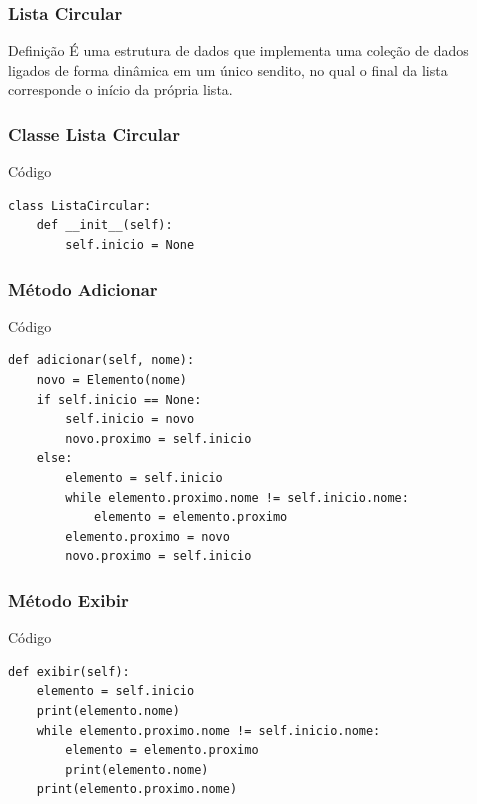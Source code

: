 \documentclass{beamer}
\begin{document}
\begin{frame}
\frametitle{Lista Circular}

\begin{block}{Definição}
	É uma estrutura de dados que implementa uma coleção de dados ligados de forma dinâmica em um único sendito, no qual o final da lista corresponde o início da própria lista.
\end{block}
\end{frame}

\begin{frame}[fragile]
\frametitle{Classe Lista Circular}

\begin{exampleblock}{Código}
\begin{lstlisting}
class ListaCircular:
    def __init__(self):
        self.inicio = None
\end{lstlisting}
\end{exampleblock}
\end{frame}

\begin{frame}[fragile]
\frametitle{Método Adicionar}

\begin{exampleblock}{Código}
\begin{lstlisting}
def adicionar(self, nome):
    novo = Elemento(nome)
    if self.inicio == None:
        self.inicio = novo
        novo.proximo = self.inicio
    else:
        elemento = self.inicio
        while elemento.proximo.nome != self.inicio.nome:
            elemento = elemento.proximo
        elemento.proximo = novo
        novo.proximo = self.inicio
\end{lstlisting}
\end{exampleblock}
\end{frame}

\begin{frame}[fragile]
\frametitle{Método Exibir}

\begin{exampleblock}{Código}
\begin{lstlisting}
def exibir(self):
    elemento = self.inicio
    print(elemento.nome)
    while elemento.proximo.nome != self.inicio.nome:
        elemento = elemento.proximo
        print(elemento.nome)
    print(elemento.proximo.nome)
\end{lstlisting}
\end{exampleblock}
\end{frame}
\end{document}
